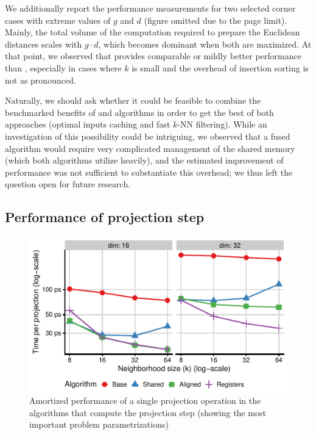 We additionally report the performance measurements for two selected corner cases with extreme values of $g$ and $d$ (figure omitted due to the page limit).
Mainly, the total volume of the computation required to prepare the Euclidean distances scales with $g\cdot d$, which becomes dominant when both are maximized.
At that point, we observed that  provides comparable or mildly better performance than , especially in cases where $k$ is small and the overhead of insertion sorting is not as pronounced.

Naturally, we should ask whether it could be feasible to combine the benchmarked benefits of  and  algorithms in order to get the best of both approaches (optimal inputs caching and fast $k$-NN filtering).
While an investigation of this possibility could be intriguing, we observed that a fused algorithm would require very complicated management of the shared memory (which both algorithms utilize heavily), and the estimated improvement of performance was not sufficient to substantiate this overhead; we thus left the question open for future research.


\subsection{Performance of projection step}


\begin{figure}
	\centering
	\includegraphics{embedsom/final-plots/algs_proj_repre_ampere}
	\caption{Amortized performance of a single projection operation in the algorithms that compute the projection step (showing the most important problem parametrizations)}
	\label{fig:proj_repre}
\end{figure}

